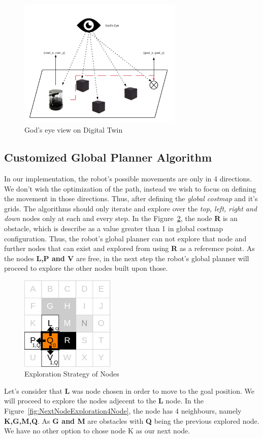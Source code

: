 \begin{figure}[th]
    \centering
    \includegraphics[width=0.7\textwidth]{Figures/God-eye.png}
    \decoRule
    \caption[]{God's eye view on Digital Twin}
    \label{fig:DigitalTwinGodEye}
\end{figure}

\subsection{Customized Global Planner Algorithm}
In our implementation, the robot's possible movements are only in 4 directions. We don't wish the optimization of the path, instead we wish to focus
on defining the movement in those directions. Thus, after defining the \textit{global costmap} and it's grids. The algorithms should only iterate and explore
over the \textit{top, left, right and down} nodes only at each and every step.
In the Figure~\ref{fig:NodeExploration4Node}, the node \textbf{R} is an obstacle, which is describe as a value greater than 1 in global costmap configuration.
Thus, the robot's global planner can not explore that node and further nodes that can exist and explored from using \textbf{R} as a referemce point.
As the nodes \textbf{L,P and V} are free, in the next step the robot's global planner will proceed to explore the other nodes built upon those.
\begin{figure}[th]
    \centering
    \includegraphics[width=0.4\textwidth]{Figures/grid_map_expansion_02.png}
    \decoRule
    \caption[]{Exploration Strategy of Nodes}
    \label{fig:NodeExploration4Node}
\end{figure}
Let's consider that \textbf{L} was node chosen in order to move to the goal position. We will proceed to explore the nodes adjecent to the \textbf{L} node.
In the Figure~\ref{fig:NextNodeExploration4Node}, the node  has 4 neighbours, namely \textbf{K,G,M,Q}. As \textbf{G and M} are obstacles with \textbf{Q} being the previous explored node.
We have no other option to chose node K as our next node.

